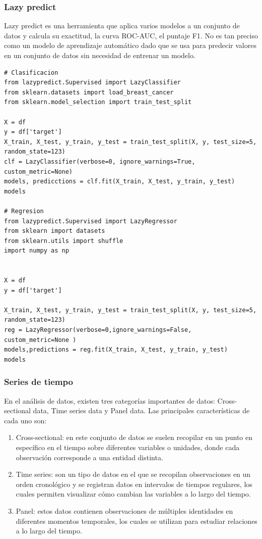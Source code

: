 \documentclass[a4paper, 12pt]{book}
\begin{document}
\subsubsection{Lazy predict}
Lazy predict es una herramienta que aplica varios modelos a un conjunto de datos y calcula su exactitud, la curva ROC-AUC, el puntaje F1. No es tan preciso como un modelo de aprendizaje automático dado que se usa para predecir valores en un conjunto de datos sin necesidad de entrenar un modelo.
\begin{verbatim}
# Clasificacion
from lazypredict.Supervised import LazyClassifier
from sklearn.datasets import load_breast_cancer
from sklearn.model_selection import train_test_split
	
X = df
y = df['target']
X_train, X_test, y_train, y_test = train_test_split(X, y, test_size=5, random_state=123)
clf = LazyClassifier(verbose=0, ignore_warnings=True, custom_metric=None)
models, predicctions = clf.fit(X_train, X_test, y_train, y_test)
models

# Regresion
from lazypredict.Supervised import LazyRegressor
from sklearn import datasets
from sklearn.utils import shuffle
import numpy as np


X = df
y = df['target']

X_train, X_test, y_train, y_test = train_test_split(X, y, test_size=5, random_state=123)
reg = LazyRegressor(verbose=0,ignore_warnings=False, custom_metric=None )
models,predictions = reg.fit(X_train, X_test, y_train, y_test)
models
\end{verbatim}

\subsubsection{Series de tiempo}
En el análisis de datos, existen tres categorías importantes de datos: Cross-sectional data, Time series data y Panel data. Las principales características de cada uno son:
\begin{enumerate}
	\item Cross-sectional: en este conjunto de datos se suelen recopilar en un punto en específico en el tiempo sobre diferentes variables o unidades, donde cada observación corresponde a una entidad distinta.
	\item Time series: son un tipo de datos en el que se recopilan observaciones en un orden cronológico y se registran datos en intervalos de tiempos regulares, los cuales permiten visualizar cómo cambian las variables a lo largo del tiempo.
	\item Panel: estos datos contienen observaciones de múltiples identidades en diferentes momentos temporales, los cuales se utilizan para estudiar relaciones a lo largo del tiempo.
\end{enumerate}
\end{document}
